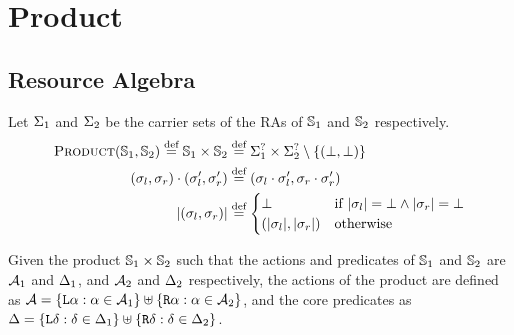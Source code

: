 
\section{Product} \label{rules:product}

\subsection{Resource Algebra}

Let $\Sigma_1$ and $\Sigma_2$ be the carrier sets of the RAs of $\mathbb S_1$ and $\mathbb S_2$ respectively.
\begin{align*}
	\textsc{Product}(\mathbb S_1,\mathbb S_2) \stackrel{\textnormal{def}}= \mathbb S_1 \times \mathbb S_2 &\stackrel{\textnormal{def}}= \Sigma_1^? \times \Sigma_2^? \setminus \{(\bot, \bot)\}\\
	(\sigma_l, \sigma_r) \cdot (\sigma_l', \sigma_r') &\stackrel{\textnormal{def}}= (\sigma_l \cdot \sigma_l', \sigma_r \cdot \sigma_r')\\
	|(\sigma_l, \sigma_r)| &\stackrel{\textnormal{def}}= \begin{cases}
		\bot &\text{if}~|\sigma_l|=\bot\land |\sigma_r|=\bot\\
		(|\sigma_l|, |\sigma_r|) &\text{otherwise}
 	\end{cases}
\end{align*}

Given the product $\mathbb S_1 \times \mathbb S_2$ such that the actions and predicates of $\mathbb S_1$ and $\mathbb S_2$ are ${\cal{A}}_1$ and $\Delta_1$, and ${\cal{A}}_2$ and $\Delta_2$ respectively, the actions of the product are defined as ${{\cal{A}} = \{\texttt{L}\alpha : \alpha \in {\ensuremath{\cal{A}}}_1 \} \uplus \{\texttt{R}\alpha : \alpha \in {\ensuremath{\cal{A}}}_2 \}}$, and the core predicates as ${\Delta = \{\texttt{L}\delta : \delta \in \Delta_1 \} \uplus \{\texttt{R}\delta : \delta \in \Delta_2 \}}$.

